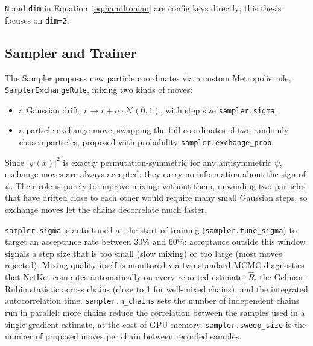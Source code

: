 \documentclass[a4paper,11pt,twoside]{article}
\begin{document}
\texttt{N} and \texttt{dim} in Equation~\ref{eq:hamiltonian} are config keys directly; this thesis focuses on \texttt{dim=2}.





\subsection{Sampler and Trainer}

The Sampler proposes new particle coordinates via a custom Metropolis rule, \texttt{SamplerExchangeRule}, mixing two kinds of moves:
\begin{itemize}
    \item a Gaussian drift, $r \rightarrow r + \sigma \cdot \mathcal{N}(0,1)$, with step size \texttt{sampler.sigma};
    \item a particle-exchange move, swapping the full coordinates of two randomly chosen particles, proposed with probability \texttt{sampler.exchange\_prob}.
\end{itemize}

Since $|\psi(x)|^2$ is exactly permutation-symmetric for any antisymmetric $\psi$, exchange moves are always accepted: they carry no information about the sign of $\psi$. Their role is purely to improve mixing: without them, unwinding two particles that have drifted close to each other would require many small Gaussian steps, so exchange moves let the chains decorrelate much faster.

\texttt{sampler.sigma} is auto-tuned at the start of training (\texttt{sampler.tune\_sigma}) to target an acceptance rate between 30\% and 60\%: acceptance outside this window signals a step size that is too small (slow mixing) or too large (most moves rejected). Mixing quality itself is monitored via two standard MCMC diagnostics that NetKet computes automatically on every reported estimate: $\hat R$, the Gelman-Rubin statistic across chains (close to 1 for well-mixed chains), and the integrated autocorrelation time. \texttt{sampler.n\_chains} sets the number of independent chains run in parallel: more chains reduce the correlation between the samples used in a single gradient estimate, at the cost of GPU memory. \texttt{sampler.sweep\_size} is the number of proposed moves per chain between recorded samples.
\end{document}
